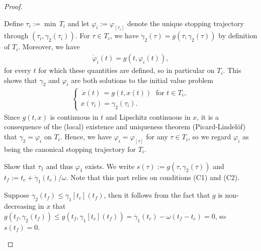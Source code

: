 \documentclass[a4paper]{article}
\theoremstyle{definition}
\theoremstyle{plain}
\begin{document}
\begin{proof}
\begin{outline}
  \2 Define $\tau_{i} := \min \, T_{i}$ and let $\varphi_{i} := \varphi_{[\tau_{i}]}$
  denote the unique stopping trajectory through $(\tau_{i}, \gamma_{2}(\tau_{i}))$.
  For $\tau \in T_{i}$, we have
  $\dot{\gamma}_{2}(\tau) = g(\tau, \gamma_{2}(\tau))$ by definition of $T_{i}$.
  Moreover, we have
  \begin{align}\label{eq:phi-tangent}
    \dot{\varphi}_{i}(t) = g(t, \varphi_{i}(t)),
  \end{align}
  for every $t$ for which these quantities are defined, so in particular on $T_{i}$.
  This shows that $\gamma_{2}$ and $\varphi_{i}$ are both solutions to the initial value problem
  \begin{align}
    \begin{cases}
      \,\dot{x}(t)\, = g(t, x(t)) \;  \text{ for } t \in T_{i} , \\
      x(\tau_{i}) = \gamma_{2}(\tau_{i}) .
    \end{cases}
  \end{align}
  Since $g(t, x)$ is continuous in $t$ and Lipschitz continuous in $x$, it is a
  consequence of the (local) existence and uniqueness theorem
  (Picard-Lindel{\"o}f) that $\gamma_{2} = \varphi_{i}$ on $T_{i}$.
  Hence, we have $\varphi_{i} = \varphi_{[\tau]}$ for any $\tau \in T_{i}$, so we regard
  $\varphi_{i}$ as being the canonical stopping trajectory for $T_{i}$.


  \1 Show that $\tau_{1}$ and thus $\varphi_{1}$ exists. We write
  $s(\tau) := g(\tau, \gamma_{2}(\tau))$ and
  $t_{f} := t_{c} + \dot{\gamma}_{1}(t_{c}) / \omega$. Note that this part
  relies on conditions (C1) and (C2).

  \2 Suppose $\gamma_{2}(t_{f}) \leq \gamma_{1}[t_{c}](t_{f})$, then it follows from the fact
  that $g$ is non-decreasing in $x$ that
  $g(t_{f}, \gamma_{2}(t_{f})) \leq g(t_{f}, \gamma_{1}[t_{c}](t_{f})) = \dot{\gamma}_{1}(t_{c}) - \omega(t_{f} - t_{c}) = 0$,
  so $s(t_{f}) = 0$.


\end{outline}
\end{proof}
\end{document}

